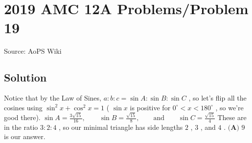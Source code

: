 \documentclass[12pt]{article}
\begin{document}
\section*{{2019 AMC 12A Problems/Problem 19}}
Source: AoPS Wiki

\subsection*{Solution}
Notice that by the Law of Sines, $a:b:c = \sin{A}:\sin{B}:\sin{C}$ , so let's flip all the cosines using $\sin^{2}{x} + \cos^{2}{x} = 1$ ( $\sin{x}$ is positive for $0^{\circ} < x < 180^{\circ}$ , so we're good there). $\sin A=\frac{3\sqrt{15}}{16}, \qquad \sin B= \frac{\sqrt{15}}{8}, \qquad \text{and} \qquad\sin C=\frac{\sqrt{15}}{4}$ These are in the ratio $3:2:4$ , so our minimal triangle has side lengths $2$ , $3$ , and $4$ . $\boxed{\textbf{(A) } 9}$ is our answer.
\end{document}
